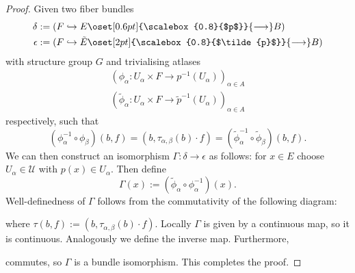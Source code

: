 \begin{proof}
        Given two fiber bundles
        \begin{align*}
            \delta & := (F \hookrightarrow E \oset[0.6pt]{\scalebox{0.8}{$p$}}{\longrightarrow} B) \\
            \epsilon & := (F \hookrightarrow \tilde{E} \oset[2pt]{\scalebox{0.8}{$\tilde{p}$}}{\longrightarrow} B)
        \end{align*}
        with structure group $G$ and trivialising atlases
        \begin{align*}
            (\phi_\alpha \colon U_\alpha \times F \to p^{-1}(U_\alpha))_{\alpha \in A} \\
            (\tilde{\phi}_\alpha \colon U_\alpha \times F \to \tilde{p}^{-1}(U_\alpha))_{\alpha \in A}
        \end{align*}
        respectively, such that
        \[
        (\phi_\alpha^{-1} \circ \phi_\beta) (b,f) = (b,\tau_{\alpha,\beta}(b) \cdot f) = (\tilde{\phi}_\alpha^{-1} \circ \tilde{\phi}_\beta) (b,f).
        \]
        We can then construct an isomorphism $\Gamma \colon \delta \to \epsilon$ as follows: for $x \in E$ choose $U_\alpha \in \mathcal{U}$ with $p(x) \in U_\alpha$. Then define
        \[
        \Gamma(x) := (\tilde{\phi}_\alpha \circ \phi_\alpha^{-1})(x).
        \]
        Well-definedness of $\Gamma$ follows from the commutativity of the following diagram:
        \begin{center}
        \end{center}
        where $\tau(b,f) := (b, \tau_{\alpha,\beta}(b) \cdot f)$. Locally $\Gamma$ is given by a continuous map, so it is continuous. Analogously we define the inverse map. Furthermore,
        \begin{center}
        \end{center}
        commutes, so $\Gamma$ is a bundle isomorphism. This completes the proof.
     \end{proof}

